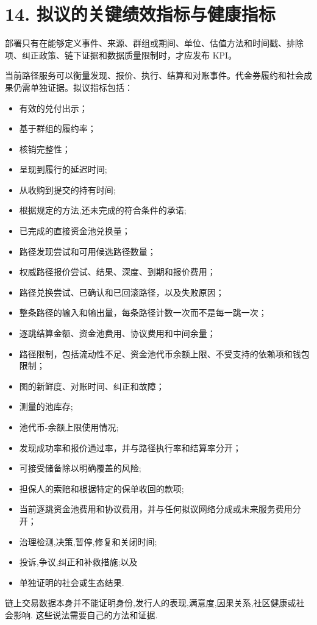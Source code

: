 \documentclass[11pt]{article}
\begin{document}
\section*{14. 拟议的关键绩效指标与健康指标}

部署只有在能够定义事件、来源、群组或期间、单位、估值方法和时间戳、排除项、纠正政策、链下证据和数据质量限制时，才应发布 KPI。

当前路径服务可以衡量发现、报价、执行、结算和对账事件。代金券履约和社会成果仍需单独证据。拟议指标包括：

\begin{itemize}[leftmargin=*]
\item 有效的兑付出示；
\item 基于群组的履约率；
\item 核销完整性；
\item 呈现到履行的延迟时间;
\item 从收购到提交的持有时间;
\item 根据规定的方法,还未完成的符合条件的承诺;
\item 已完成的直接资金池兑换量；
\item 路径发现尝试和可用候选路径数量；
\item 权威路径报价尝试、结果、深度、到期和报价费用；
\item 路径兑换尝试、已确认和已回滚路径，以及失败原因；
\item 整条路径的输入和输出量，每条路径计数一次而不是每一跳一次；
\item 逐跳结算金额、资金池费用、协议费用和中间余量；
\item 路径限制，包括流动性不足、资金池代币余额上限、不受支持的依赖项和钱包限制；
\item 图的新鲜度、对账时间、纠正和故障；
\item 测量的池库存;
\item 池代币-余额上限使用情况;
\item 发现成功率和报价通过率，并与路径执行率和结算率分开；
\item 可接受储备除以明确覆盖的风险;
\item 担保人的索赔和根据特定的保单收回的款项;
\item 当前逐跳资金池费用和协议费用，并与任何拟议网络分成或未来服务费用分开；
\item 治理检测,决策,暂停,修复和关闭时间;
\item 投诉,争议,纠正和补救措施;以及
\item 单独证明的社会或生态结果.
\end{itemize}
链上交易数据本身并不能证明身份,发行人的表现,满意度,因果关系,社区健康或社会影响. 这些说法需要自己的方法和证据.
\end{document}
